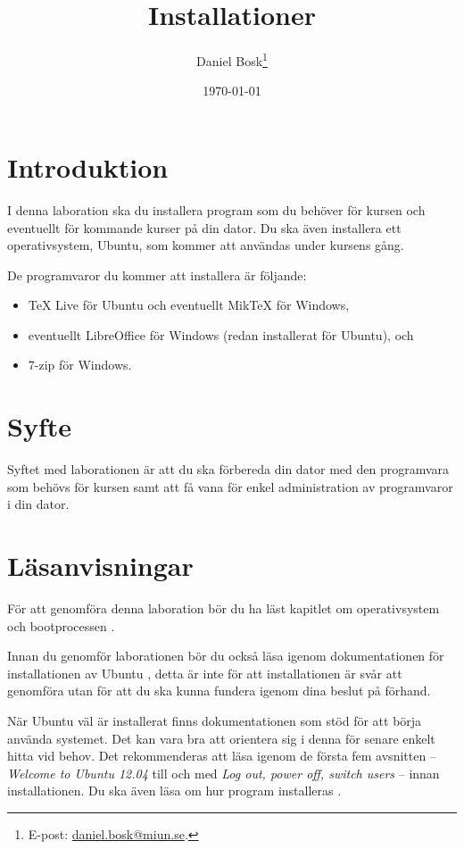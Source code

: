 \documentclass[11pt,a4paper]{miunasgn}
\title{Installationer}
\author{Daniel Bosk\footnote{%
	E-post: \href{mailto:daniel.bosk@miun.se}{daniel.bosk@miun.se}.
}}
\date{\today}
\begin{document}
\maketitle
\thispagestyle{foot}
\tableofcontents


\section{Introduktion}
\label{sec:Introduktion}
\noindent
I denna laboration ska du installera program som du behöver för kursen och 
eventuellt för kommande kurser på din dator.
Du ska även installera ett operativsystem, Ubuntu, som kommer att användas 
under kursens gång.

De programvaror du kommer att installera är följande:
\begin{itemize}
	\item TeX Live för Ubuntu och eventuellt MikTeX för Windows,
	\item eventuellt LibreOffice för Windows (redan installerat för Ubuntu), och
	\item 7-zip för Windows.
\end{itemize}


\section{Syfte}
\label{sec:Syfte}
\noindent
Syftet med laborationen är att du ska förbereda din dator med den programvara 
som behövs för kursen samt att få vana för enkel administration av programvaror 
i din dator.


\section{Läsanvisningar}
\label{sec:Lasanvisningar}
\noindent
För att genomföra denna laboration bör du ha läst kapitlet om operativsystem 
och bootprocessen \citep[kapitel 3]{Brookshear2012csa}.

Innan du genomför laborationen bör du också läsa igenom dokumentationen för 
installationen av Ubuntu \citep{UbuntuInstall}, detta är inte för att 
installationen är svår att genomföra utan för att du ska kunna fundera igenom 
dina beslut på förhand.

När Ubuntu väl är installerat finns dokumentationen \citep{UbuntuDesktop} som 
stöd för att börja använda systemet.
Det kan vara bra att orientera sig i denna för senare enkelt hitta vid behov.
Det rekommenderas att läsa igenom de första fem avsnitten -- \emph{Welcome to 
Ubuntu 12.04} till och med \emph{Log out, power off, switch users} -- innan 
installationen.
Du ska även läsa om hur program installeras \citep[se Install additional 
software]{UbuntuDesktop}.
\end{document}
